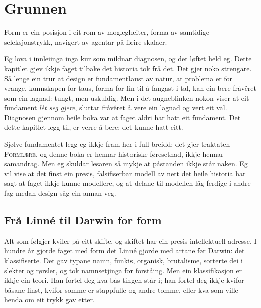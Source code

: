 \chapter{Grunnen}

\begin{motto}
Form er ein posisjon i eit rom av moglegheiter, forma av samtidige\\ seleksjonstrykk, navigert av agentar på fleire skalaer.
\end{motto}

Eg lova i innleiinga inga kur som mildnar diagnosen, og det løftet held eg. Dette kapitlet gjev ikkje faget tilbake det historia tok frå det. Det gjer noko strengare. Så lenge ein trur at design er fundamentlaust av natur, at problema er for vrange, kunnskapen for taus, forma for fin til å fangast i tal, kan ein bere fråvêret som ein lagnad: tungt, men uskuldig. Men i det augneblinken nokon viser at eit fundament \emph{lèt seg gjere}, sluttar fråvêret å vere ein lagnad og vert eit val. Diagnosen gjennom heile boka var at faget aldri har hatt eit fundament. Det dette kapitlet legg til, er verre å bere: det kunne hatt eitt.

Sjølve fundamentet legg eg ikkje fram her i full breidd; det gjer traktaten \textsc{Formlære}, og denne boka er hennar historiske føresetnad, ikkje hennar samandrag. Men eg skuldar lesaren så mykje at påstanden ikkje står naken. Eg vil vise at det finst ein presis, falsifiserbar modell av nett det heile historia har sagt at faget ikkje kunne modellere, og at delane til modellen låg ferdige i andre fag medan design såg ein annan veg.


\section{Frå Linné til Darwin for form}

Alt som følgjer kviler på eitt skifte, og skiftet har ein presis intellektuell adresse. I hundre år gjorde faget med form det Linné gjorde med artane før Darwin: det klassifiserte. Det gav typane namn, funkis, organisk, brutalisme, sorterte dei i slekter og rørsler, og tok namnsetjinga for forståing. Men ein klassifikasjon er ikkje ein teori. Han fortel deg kva bås tingen står i; han fortel deg ikkje kvifor båsane finst, kvifor somme er stappfulle og andre tomme, eller kva som ville henda om eit trykk gav etter.

